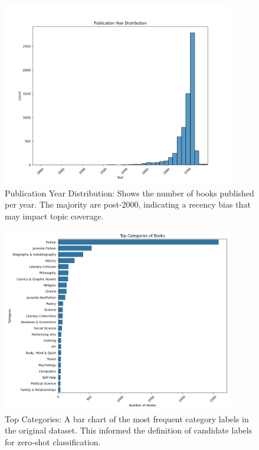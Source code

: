 \begin{figure}[H]
    \centering
    \includegraphics[width=0.9\textwidth]{figures/publication_year_distribution.png}
    \caption{Publication Year Distribution: Shows the number of books published per year. The majority are post-2000, indicating a recency bias that may impact topic coverage.}
\end{figure}

\begin{figure}[H]
    \centering
    \includegraphics[width=0.9\textwidth]{figures/top_categories.png}
    \caption{Top Categories: A bar chart of the most frequent category labels in the original dataset. This informed the definition of candidate labels for zero-shot classification.}
\end{figure}

